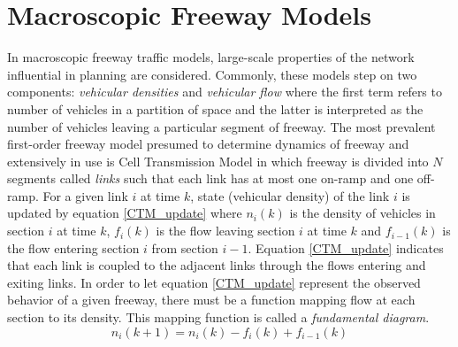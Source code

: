 \documentclass[twocolumn,10pt]{asme2e}
\begin{document}
\section{Macroscopic Freeway Models}
In macroscopic freeway traffic models, large-scale properties of the network influential in planning are considered. Commonly, these models step on two components: \emph{vehicular densities} and \emph{vehicular flow} where the first term refers to number of vehicles in a partition of space and the latter is interpreted as the number of vehicles leaving a particular segment of freeway. 
The most prevalent first-order freeway model presumed to determine dynamics of freeway and extensively in use is Cell Transmission Model \cite{CTM} in which freeway is divided into $N$ segments called \emph{links}  such that each link has at most one on-ramp and one off-ramp. For a given link $i$ at time $k$, state (vehicular density) of the link $i$ is updated by equation \ref{CTM_update} where $n_i(k)$ is the density of vehicles in section $i$ at time $k$, $f_i(k)$ is the flow leaving section $i$ at time $k$ and  $f_{i-1}(k)$ is the flow entering section $i$ from section $i-1$. Equation \ref{CTM_update} indicates that each link is coupled to the adjacent links through the flows entering and exiting links. 
In order to let equation \ref{CTM_update} represent the observed behavior of a given freeway, there must be a function mapping flow at each section to its density. This mapping function is called a \textit{fundamental diagram}.
\begin{equation} \label{CTM_update}
n_i(k+1) = n_i(k) - f_i(k) + f_{i-1}(k)
\end{equation}
\end{document}
